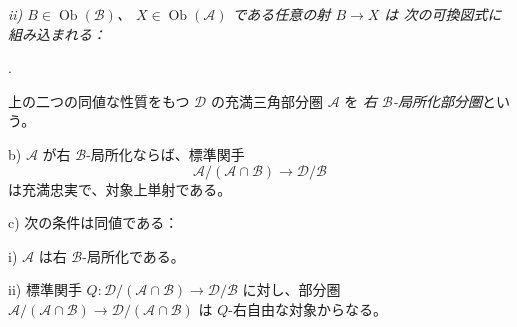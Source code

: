 \clearpage
{}%
\begingroup
\small
\setlength{\parskip}{0pt}%
\setlength{\emergencystretch}{1.5em}%
\setlength{\abovedisplayskip}{3pt plus 1pt minus 1pt}%
\setlength{\belowdisplayskip}{3pt plus 1pt minus 1pt}%

\begingroup\itshape
{}
\noindent\hspace{1.2em}ii) $B\in\operatorname{Ob}(\mathcal B)$、
$X\in\operatorname{Ob}(\mathcal A)$ である任意の射 $B\longrightarrow X$ は
次の可換図式に組み込まれる：
\begin{center}
 \quad .
\end{center}
上の二つの同値な性質をもつ $\mathcal D$ の充満三角部分圏 $\mathcal A$ を
\emph{右 $\mathcal B$-局所化部分圏}という。
\par\noindent b) $\mathcal A$ が右 $\mathcal B$-局所化ならば、標準関手
\[
 \mathcal A/(\mathcal A\cap\mathcal B)\longrightarrow\mathcal D/\mathcal B
\]
は充満忠実で、対象上単射である。
\par\noindent c) 次の条件は同値である：
\par\noindent\hspace{1.2em}i) $\mathcal A$ は右 $\mathcal B$-局所化である。
\par\noindent\hspace{1.2em}ii) 標準関手
$Q\colon\mathcal D/(\mathcal A\cap\mathcal B)\longrightarrow
\mathcal D/\mathcal B$ に対し、部分圏
$\mathcal A/(\mathcal A\cap\mathcal B)\longrightarrow
\mathcal D/(\mathcal A\cap\mathcal B)$ は $Q$-右自由な対象からなる。
\endgroup


